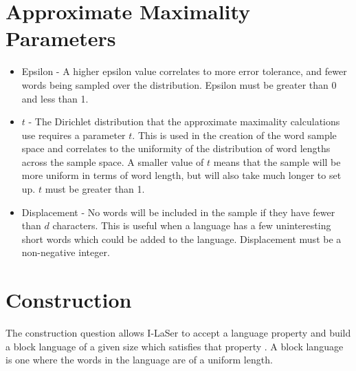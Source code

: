 \documentclass{article}
\begin{document}
\section{Approximate Maximality Parameters}
\begin{itemize}
\item Epsilon - A higher epsilon value correlates to more error tolerance, and fewer words being sampled over the distribution. Epsilon must be greater than 0 and less than 1.
\item $t$ - The Dirichlet distribution that the approximate maximality calculations use requires a parameter $t$.
This is used in the creation of the word sample space and correlates to the uniformity of the distribution of word lengths across the sample space. A smaller value of $t$ means that the sample will be more uniform in terms of word length, but will also take much longer to set up.
$t$ must be greater than 1.
\item Displacement - No words will be included in the sample if they have fewer than $d$ characters.
This is useful when a language has a few uninteresting short words which could be added to the language. Displacement must be a non-negative integer.
\end{itemize}

\section{Construction}
The construction question allows I-LaSer to accept a language property and build a block language of a given size which satisfies that property \cite{Construction}.
A block language is one where the words in the language are of a uniform length.
\end{document}
